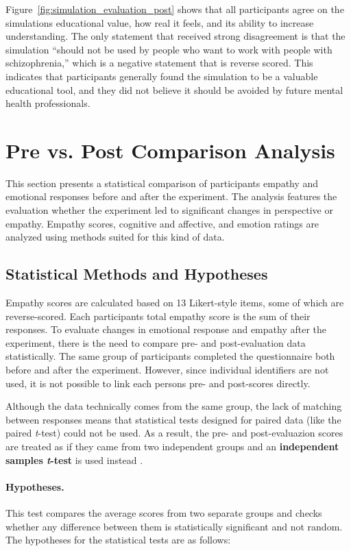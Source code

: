Figure~\ref{fig:simulation_evaluation_post} shows that all participants agree on the simulations educational value, how real it feels, and its ability to increase understanding. The only statement that received strong disagreement is that the simulation “should not be used by people who want to work with people with schizophrenia,” which is a negative statement that is reverse scored. This indicates that participants generally found the simulation to be a valuable educational tool, and they did not believe it should be avoided by future mental health professionals.

\section{Pre vs. Post Comparison Analysis}
\label{sec:pre_post_comparison}
This section presents a statistical comparison of participants empathy and emotional responses before and after the experiment. The analysis features the evaluation whether the experiment led to significant changes in perspective or empathy. Empathy scores, cognitive and affective, and emotion ratings are analyzed using methods suited for this kind of data.

\subsection{Statistical Methods and Hypotheses}

Empathy scores are calculated based on 13 Likert-style items, some of which are reverse-scored. Each participants total empathy score is the sum of their responses. To evaluate changes in emotional response and empathy after the experiment, there is the need to compare pre- and post-evaluation data statistically. The same group of participants completed the questionnaire both before and after the experiment. However, since individual identifiers are not used, it is not possible to link each persons pre- and post-scores directly.

Although the data technically comes from the same group, the lack of matching between responses means that statistical tests designed for paired data (like the paired \textit{t}-test) could not be used. As a result, the pre- and post-evaluazion scores are treated as if they came from two independent groups and an \textbf{independent samples \textit{t}-test} is used instead \cite{independentTtest}.

\paragraph{Hypotheses.} This test compares the average scores from two separate groups and checks whether any difference between them is statistically significant and not random. The hypotheses for the statistical tests are as follows:

